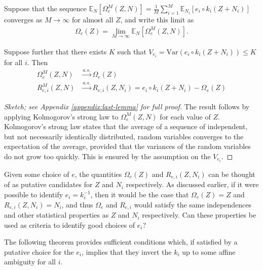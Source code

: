 \begin{lemma}\label{lem:last-lemma}
	Suppose that the sequence $\mathbb{E}_{N}[\Omega_{e}^M(Z, N)] = \frac{1}{M}\sum_{i=1}^M \mathbb{E}_{N_i}[{e}_i\circ {k}_i( Z + N_i)] $ converges as $M \to \infty$ for almost all $Z$, and write this limit as
	\begin{align*}
	\Omega_e(Z) = \lim_{M\to\infty}\mathbb{E}_{N}[\Omega_{e}^M(Z, N)].
	\end{align*}
	
	Suppose further that there exists $K$ such that $V_{e_i} = \mathrm{Var}\left({e}_i \circ {k}_i(Z + N_i) \right) \leq K$ for all $i$.
	Then
	\begin{align*}
	\Omega_{e}^M(Z, N) & \overset{a.s.}{\longrightarrow} \Omega_{e}(Z) \\
	R_{e, i}^M(Z, N) & \overset{a.s.}{\longrightarrow} R_{e, i}(Z, N_i) = {e}_i\circ {k}_i( Z + N_i) - \Omega_{e}(Z)
	\end{align*}
\end{lemma}
\begin{proof}[Sketch; see Appendix \ref{appendix:last-lemma} for full proof]
The result follows by applying Kolmogorov's strong law to $\Omega_{e}^M(Z, N)$ for each value of $Z$.
Kolmogorov's strong law states that the average of a sequence of independent, but not necessarily identically distributed, random variables converges to the expectation of the average, provided that the variances of the random variables do not grow too quickly. 
This is ensured by the assumption on the $V_{e_i}$.
\end{proof}


Given some choice of ${e}$, the quantities $\Omega_{e}(Z)$ and $R_{e, i}(Z, N_i)$ can be thought of as putative candidates for $Z$ and $N_i$ respectively.
As discussed earlier, if it were possible to identify ${e}_i={k}_i^{-1}$, then it would be the case that $\Omega_{e}(Z) = Z$ and $R_{e, i}(Z, N_i) = N_i$, and thus $\Omega_{e}$ and $R_{e, i}$ would satisfy the same independences and other statistical properties as $Z$ and $N_i$ respectively.
Can these properties be used as criteria to identify good choices of ${e}_i$?

The following theorem provides sufficient conditions which, if satisfied by a putative choice for the $e_i$, implies that they invert the $k_i$ up to some affine ambiguity for all $i$. 


